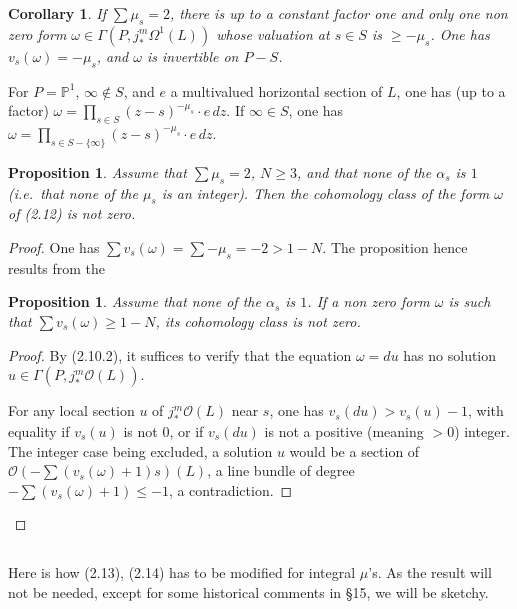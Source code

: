 \documentclass[12pt,a4paper]{article}
\theoremstyle{plain}
\newtheorem{proposition}[theorem]{Proposition}
\newtheorem{corollary}[theorem]{Corollary}
\theoremstyle{definition}
\theoremstyle{remark}
\newcommand{\PP}{\mathbb{P}}
\numberwithin{equation}{section}
\providecommand{\PP}{\mathbb{P}}
\begin{document}
\begin{corollary}\label{cor:2.12}
If $\sum \mu_s = 2$, there is up to a constant factor one and only one non zero form $\omega \in \Gamma(P, j_*^m \Omega^1(L))$ whose valuation at $s \in S$ is $\geq -\mu_s$. One has $v_s(\omega) = -\mu_s$, and $\omega$ is invertible on $P-S$.
\end{corollary}

For $P = \PP^1$, $\infty \notin S$, and $e$ a multivalued horizontal section of $L$, one has (up to a factor) $\omega = \prod_{s \in S} (z-s)^{-\mu_s} \cdot e \, dz$. If $\infty \in S$, one has $\omega = \prod_{s \in S - \{\infty\}} (z-s)^{-\mu_s} \cdot e \, dz$.

\begin{proposition}\label{prop:2.13}
Assume that $\sum \mu_s = 2$, $N \geq 3$, and that none of the $\alpha_s$ is $1$ (i.e.\ that none of the $\mu_s$ is an integer). Then the cohomology class of the form $\omega$ of (2.12) is not zero.
\end{proposition}

\begin{proof}
One has $\sum v_s(\omega) = \sum -\mu_s = -2 > 1-N$. The proposition hence results from the
\begin{proposition}\label{prop:2.14}
Assume that none of the $\alpha_s$ is $1$. If a non zero form $\omega$ is such that $\sum v_s(\omega) \geq 1 - N$, its cohomology class is not zero.
\end{proposition}
\begin{proof}
By (2.10.2), it suffices to verify that the equation $\omega = du$ has no solution $u \in \Gamma(P, j_*^m \mathcal{O}(L))$.

For any local section $u$ of $j_*^m \mathcal{O}(L)$ near $s$, one has $v_s(du) > v_s(u) - 1$, with equality if $v_s(u)$ is not $0$, or if $v_s(du)$ is not a positive (meaning $> 0$) integer. The integer case being excluded, a solution $u$ would be a section of $\mathcal{O}(-\sum (v_s(\omega)+1)s)(L)$, a line bundle of degree $-\sum(v_s(\omega)+1) \leq -1$, a contradiction.
\end{proof}
\end{proof}

\subsection{}
Here is how (2.13), (2.14) has to be modified for integral $\mu$'s. As the result will not be needed, except for some historical comments in \S 15, we will be sketchy.
\end{document}
